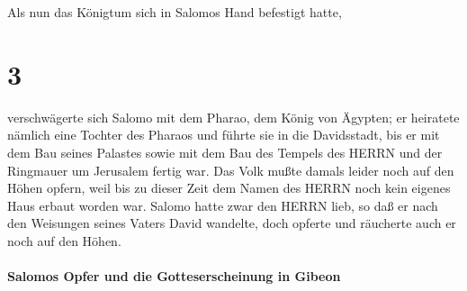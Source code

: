 Als nun das Königtum sich in Salomos Hand befestigt hatte,

\hypertarget{section-2}{%
\section{3}\label{section-2}}

verschwägerte sich Salomo mit dem Pharao, dem König von
Ägypten; er heiratete nämlich eine Tochter des Pharaos und führte sie in
die Davidsstadt, bis er mit dem Bau seines Palastes sowie mit dem Bau
des Tempels des HERRN und der Ringmauer um Jerusalem fertig war.
Das Volk mußte damals leider noch auf den Höhen opfern,
weil bis zu dieser Zeit dem Namen des HERRN noch kein eigenes Haus
erbaut worden war. Salomo hatte zwar den HERRN lieb, so
daß er nach den Weisungen seines Vaters David wandelte, doch opferte und
räucherte auch er noch auf den Höhen.

\hypertarget{salomos-opfer-und-die-gotteserscheinung-in-gibeon}{%
\paragraph{Salomos Opfer und die Gotteserscheinung in
Gibeon}\label{salomos-opfer-und-die-gotteserscheinung-in-gibeon}}

